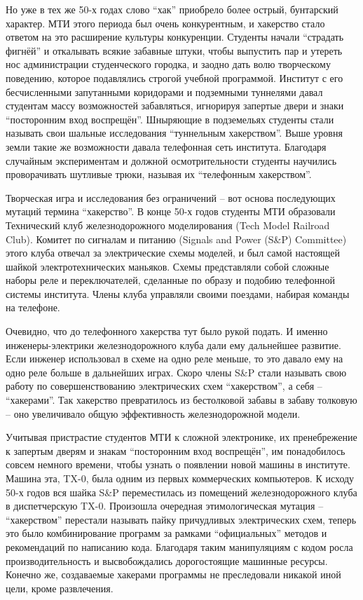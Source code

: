 Но уже в тех же 50-х годах слово \enquote{хак} приобрело более острый, бунтарский характер. МТИ этого периода был очень конкурентным, и хакерство стало ответом на это расширение культуры конкуренции. Студенты начали \enquote{страдать фигнёй} и откалывать всякие забавные штуки, чтобы выпустить пар и утереть нос администрации студенческого городка, и заодно дать волю творческому поведению, которое подавлялись строгой учебной программой. Институт с его бесчисленными запутанными коридорами и подземными туннелями давал студентам массу возможностей забавляться, игнорируя запертые двери и знаки \enquote{посторонним вход воспрещён}. Шныряющие в подземельях студенты стали называть свои шальные исследования \enquote{туннельным хакерством}. Выше уровня земли такие же возможности давала телефонная сеть института. Благодаря случайным экспериментам и должной осмотрительности студенты научились проворачивать шутливые трюки, называя их \enquote{телефонным хакерством}.

Творческая игра и исследования без ограничений -- вот основа последующих мутаций термина \enquote{хакерство}. В конце 50-х годов студенты МТИ образовали Технический клуб железнодорожного моделирования (Tech Model Railroad Club). Комитет по сигналам и питанию (Signals and Power (S\&P) Committee) этого клуба отвечал за электрические схемы моделей, и был самой настоящей шайкой электротехнических маньяков. Схемы представляли собой сложные наборы реле и переключателей, сделанные по образу и подобию телефонной системы института. Члены клуба управляли своими поездами, набирая команды на телефоне.

Очевидно, что до телефонного хакерства тут было рукой подать. И именно инженеры-электрики железнодорожного клуба дали ему дальнейшее развитие. Если инженер использовал в схеме на одно реле меньше, то это давало ему на одно реле больше в дальнейших играх. Скоро члены S\&P стали называть свою работу по совершенствованию электрических схем \enquote{хакерством}, а себя -- \enquote{хакерами}. Так хакерство превратилось из бестолковой забавы в забаву толковую -- оно увеличивало общую эффективность железнодорожной модели.

Учитывая пристрастие студентов МТИ к сложной электронике, их пренебрежение к запертым дверям и знакам \enquote{посторонним вход воспрещён}, им понадобилось совсем немного времени, чтобы узнать о появлении новой машины в институте. Машина эта, TX-0, была одним из первых коммерческих компьютеров. К исходу 50-х годов вся шайка S\&P переместилась из помещений железнодорожного клуба в диспетчерскую TX-0. Произошла очередная этимологическая мутация -- \enquote{хакерством} перестали называть пайку причудливых электрических схем, теперь это было комбинирование программ за рамками \enquote{официальных} методов и рекомендаций по написанию кода. Благодаря таким манипуляциям с кодом росла производительность и высвобождались дорогостоящие машинные ресурсы. Конечно же, создаваемые хакерами программы не преследовали никакой иной цели, кроме развлечения.

